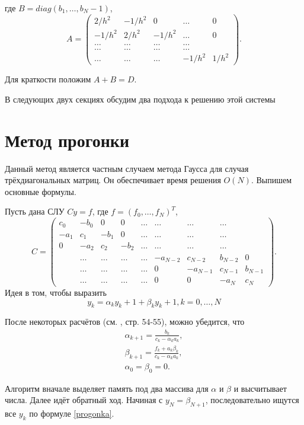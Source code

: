 \documentclass[12 pt, russian]{article}
\newcommand\beq{\begin{equation}}
\newcommand\eeq{\end{equation}}
\newcommand\bea{\begin{eqnarray}}
\newcommand\eea{\end{eqnarray}}
\begin{document}
где $B = diag(b_1, \dots, b_N-1)$,
\beq
\label{matrixA}
A = \begin{pmatrix}
2/h^2 & -1/h^2 & 0 & \dots & 0 \\
-1/h^2 & 2/h^2  & -1/h^2 & \dots & 0 \\
\dots & \dots &\dots &\dots \\
\dots & \dots &\dots &\dots \\
\dots & \dots & \dots& -1/h^2 & 1/h^2
\end{pmatrix}.
\eeq



Для краткости положим $A + B = D$.

В следующих двух секциях обсудим два подхода к решению этой системы

\section{Метод прогонки}

Данный метод является частным случаем метода Гаусса для случая трёхдиагональных матриц. Он обеспечивает время решения $O(N)$. Выпишем основные формулы.

Пусть дана СЛУ $Cy = f$, где $f = (f_0, \dots, f_N)^T$,
\beq
C = 
\begin{pmatrix}
c_0 & -b_0 &   0   & 0 & \dots &\dots &\dots &\dots \\
-a_1 & c_1 & -b_1 & 0 & \dots &\dots &\dots &\dots \\
0 & -a_2 & c_2 &-b_2 & \dots &\dots &\dots &\dots \\
& \dots &\dots &\dots &\dots & -a_{N-2} & c_{N-2} & b_{N-2} & 0\\
& \dots &\dots &\dots &\dots & 0 & -a_{N-1} & c_{N-1} & b_{N-1}\\
& \dots &\dots &\dots &\dots & 0 & 0 & -a_{N} & c_{N} 
\end{pmatrix}.
\eeq
Идея в том, чтобы выразить 
\beq
\label{progonka}
y_k = \alpha_k y_k+1 + \beta_k y_k+1, k = 0, \dots, N
\eeq

После некоторых расчётов (см. \cite{Kornev2}, стр. 54-55), можно убедится, что
\bea
\alpha_{k+1} = \frac{b_k}{c_k - \alpha_k a_k}, \\
\beta_{k+1} = \frac{f_k + a_k \beta_k}{c_k - \alpha_k a_k}, \\
\alpha_0 = \beta_0 = 0.
\eea

Алгоритм вначале выделяет память под два массива для $\alpha$ и $\beta$ и высчитывает числа.
Далее идёт обратный ход. Начиная с $y_N = \beta_{N+1}$, последовательно ищутся все $y_k$ по формуле \eqref{progonka}.
\end{document}
